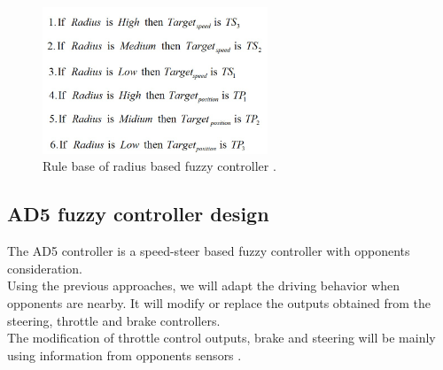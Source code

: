 \documentclass{llncs}
\begin{document}
\begin{figure}[h!]
	
	\centering
	\includegraphics[width=0.6\textwidth]{fig/regle.png}
	\begin{minipage}{10cm}
		\centering
		\caption{\footnotesize Rule base of radius based fuzzy  controller .}
		\label{fig40}
	\end{minipage} 
	
	
\end{figure}

\subsection{AD5 fuzzy controller design}


The AD5 controller is a speed-steer based fuzzy controller with opponents consideration.\\

Using the previous approaches, we will adapt the driving behavior when opponents are nearby. It will modify or replace the outputs obtained from the steering, throttle and brake controllers.
\\

The modification of throttle control outputs, brake and steering will be mainly using information from opponents sensors .
\end{document}
